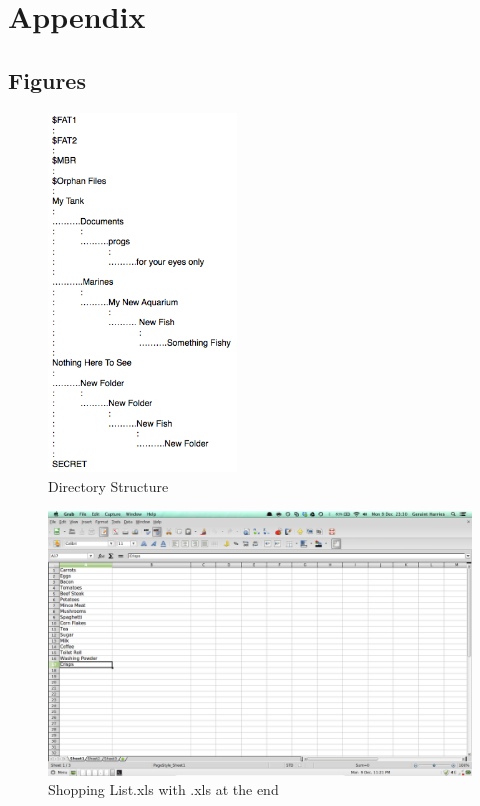 \documentclass[12pt]{article}
\begin{document}
		\section{Appendix}	

			\subsection{Figures}

				\begin{figure}[ht!]
					\centering
					\includegraphics[width=5cm]{Images/DirectoryStructure.png}
					\caption{Directory Structure}
				\end{figure}

				\begin{figure}[ht!]
					\centering
					\includegraphics[width=12cm]{Images/ShoppingListExcel.png}	
					\caption{Shopping List.xls with .xls at the end}
				\end{figure}
\end{document}

